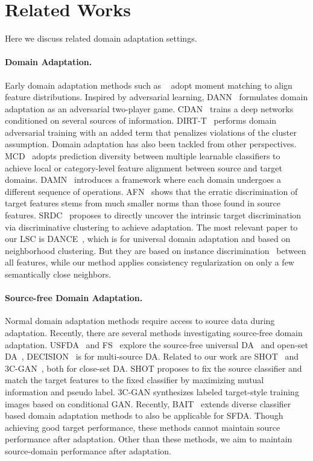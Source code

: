 \documentclass[10pt,twocolumn,letterpaper]{article}
\begin{document}
\section{Related Works}
Here we discuss related domain adaptation settings.\paragraph{Domain Adaptation.}
Early domain adaptation methods such as ~\cite{long2015learning,sun2016return,tzeng2014deep} adopt moment matching to align feature distributions. Inspired by adversarial learning, DANN~\cite{ganin2016domain} formulates domain adaptation as an adversarial two-player game. CDAN~\cite{long2018conditional} trains a deep networks conditioned on several sources of information. DIRT-T~\cite{shu2018dirt} performs domain adversarial training with an added term that penalizes violations of the cluster assumption. Domain adaptation has also been tackled from other perspectives. MCD~\cite{saito2018maximum} adopts prediction diversity between multiple learnable classifiers to achieve local or category-level feature alignment between source and target domains. DAMN~\cite{bermudez2020domain} introduces a framework where each domain undergoes a different sequence of operations. AFN~\cite{Xu_2019_ICCV} shows that the erratic discrimination of target features stems from much smaller norms than those found in source features. SRDC~\cite{tang2020unsupervised} proposes to directly uncover the intrinsic target discrimination via discriminative clustering to achieve adaptation. The most relevant paper to our LSC is DANCE~\cite{saito2020universal}, which is for universal domain adaptation and based on neighborhood clustering. 
But they are based on instance discrimination~\cite{wu2018unsupervised} between all features, while our method applies consistency regularization on only a few semantically close neighbors.

\vspace{-2mm}
\paragraph{Source-free Domain Adaptation.}
Normal domain adaptation methods require access to source data during adaptation. Recently, there are several methods investigating source-free domain adaptation. USFDA~\cite{kundu2020universal} and FS~\cite{kundu2020towards} explore the source-free universal DA~\cite{you2019universal} and open-set DA~\cite{saito2018open}, DECISION~\cite{ahmed2021unsupervised} is for multi-source DA. Related to our work are SHOT~\cite{liang2020we} and 3C-GAN~\cite{li2020model}, both for close-set DA. SHOT proposes to fix the source classifier and match the target features to the fixed classifier by maximizing mutual information and pseudo label. 3C-GAN synthesizes labeled target-style training images based on conditional GAN.  Recently, BAIT~\cite{yang2020unsupervised} extends diverse classifier based domain adaptation methods to also be applicable for SFDA. Though achieving good target performance, these methods cannot maintain source performance after adaptation. Other than these methods, we aim to maintain source-domain performance after adaptation.
\end{document}
